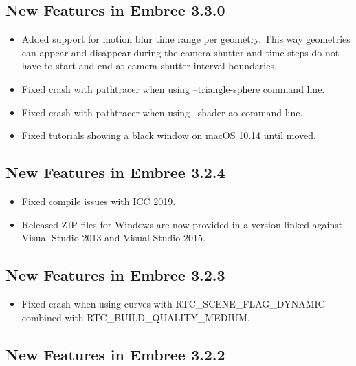 \subsection{New Features in Embree
3.3.0}\label{new-features-in-embree-3.3.0}

\begin{itemize}
\tightlist
\item
  Added support for motion blur time range per geometry. This way
  geometries can appear and disappear during the camera shutter and time
  steps do not have to start and end at camera shutter interval
  boundaries.
\item
  Fixed crash with pathtracer when using --triangle-sphere command line.
\item
  Fixed crash with pathtracer when using --shader ao command line.
\item
  Fixed tutorials showing a black window on macOS 10.14 until moved.
\end{itemize}

\subsection{New Features in Embree
3.2.4}\label{new-features-in-embree-3.2.4}

\begin{itemize}
\tightlist
\item
  Fixed compile issues with ICC 2019.
\item
  Released ZIP files for Windows are now provided in a version linked
  against Visual Studio 2013 and Visual Studio 2015.
\end{itemize}

\subsection{New Features in Embree
3.2.3}\label{new-features-in-embree-3.2.3}

\begin{itemize}
\tightlist
\item
  Fixed crash when using curves with RTC\_SCENE\_FLAG\_DYNAMIC combined
  with RTC\_BUILD\_QUALITY\_MEDIUM.
\end{itemize}

\subsection{New Features in Embree
3.2.2}\label{new-features-in-embree-3.2.2}

